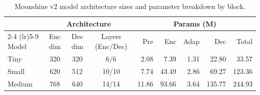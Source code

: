 \begin{table}[t]
    \centering
    \small
    \setlength{\tabcolsep}{4pt}
    \begin{tabular}{l c c c r r r r r}
    \toprule
    & \multicolumn{3}{c}{Architecture} & \multicolumn{5}{c}{Params (M)} \\
    \cmidrule(lr){2-4} \cmidrule(lr){5-9}
    Model & Enc dim & Dec dim & Layers (Enc/Dec) & Pre & Enc & Adap & Dec & Total \\
    \midrule
    Tiny   & 320 & 320 & 6/6   & 2.08 & 7.39 & 1.31 & 22.80 & 33.57 \\
    Small & 620 & 512 & 10/10 & 7.74 & 43.49 & 2.86 & 69.27 & 123.36 \\
    Medium & 768 & 640 & 14/14 & 11.86 & 93.66 & 3.64 & 135.77 & 244.93 \\
    \bottomrule
    \end{tabular}
    \caption{Moonshine v2 model architecture sizes and parameter breakdown by block.}
    \label{tab:model-sizes}
\end{table}
